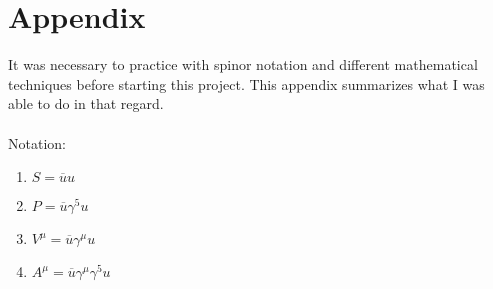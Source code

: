 \documentclass[12pt]{article}
\def \ou{\overline{u}}
\def \ga{\gamma}
\begin{document}
\section{Appendix}
It was necessary to practice with spinor notation and different mathematical techniques before starting this project. This appendix summarizes what I was able to do in that regard.\\
\\
Notation:
\begin{enumerate} \itemsep=-15pt
\item $S= \ou u$\\
\item $P=\ou \ga^5 u$ \\
\item $V^\mu = \ou \ga^\mu u$ \\
\item $A^\mu = \ou \ga^\mu \ga^5 u $ 
\end{enumerate}
\bigskip
\end{document}
